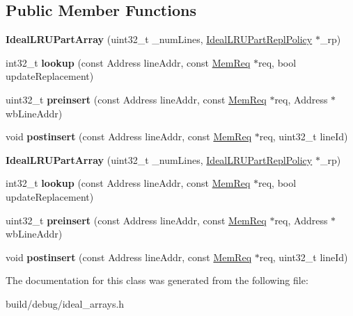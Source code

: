 \subsection*{Public Member Functions}
\begin{DoxyCompactItemize}
\item 
\hypertarget{classIdealLRUPartArray_a568cfad2ecdcbb3252d9aea18ebe89d5}{{\bfseries Ideal\-L\-R\-U\-Part\-Array} (uint32\-\_\-t \-\_\-num\-Lines, \hyperlink{classIdealLRUPartReplPolicy}{Ideal\-L\-R\-U\-Part\-Repl\-Policy} $\ast$\-\_\-rp)}\label{classIdealLRUPartArray_a568cfad2ecdcbb3252d9aea18ebe89d5}

\item 
\hypertarget{classIdealLRUPartArray_aa73a82fc679c92237e03bb21ec260ee9}{int32\-\_\-t {\bfseries lookup} (const Address line\-Addr, const \hyperlink{structMemReq}{Mem\-Req} $\ast$req, bool update\-Replacement)}\label{classIdealLRUPartArray_aa73a82fc679c92237e03bb21ec260ee9}

\item 
\hypertarget{classIdealLRUPartArray_a2b01290a2a0f8748057e1fa2a52cbea9}{uint32\-\_\-t {\bfseries preinsert} (const Address line\-Addr, const \hyperlink{structMemReq}{Mem\-Req} $\ast$req, Address $\ast$wb\-Line\-Addr)}\label{classIdealLRUPartArray_a2b01290a2a0f8748057e1fa2a52cbea9}

\item 
\hypertarget{classIdealLRUPartArray_ae3bd83a71bc6234f2c954b54b73c5171}{void {\bfseries postinsert} (const Address line\-Addr, const \hyperlink{structMemReq}{Mem\-Req} $\ast$req, uint32\-\_\-t line\-Id)}\label{classIdealLRUPartArray_ae3bd83a71bc6234f2c954b54b73c5171}

\item 
\hypertarget{classIdealLRUPartArray_a568cfad2ecdcbb3252d9aea18ebe89d5}{{\bfseries Ideal\-L\-R\-U\-Part\-Array} (uint32\-\_\-t \-\_\-num\-Lines, \hyperlink{classIdealLRUPartReplPolicy}{Ideal\-L\-R\-U\-Part\-Repl\-Policy} $\ast$\-\_\-rp)}\label{classIdealLRUPartArray_a568cfad2ecdcbb3252d9aea18ebe89d5}

\item 
\hypertarget{classIdealLRUPartArray_aa73a82fc679c92237e03bb21ec260ee9}{int32\-\_\-t {\bfseries lookup} (const Address line\-Addr, const \hyperlink{structMemReq}{Mem\-Req} $\ast$req, bool update\-Replacement)}\label{classIdealLRUPartArray_aa73a82fc679c92237e03bb21ec260ee9}

\item 
\hypertarget{classIdealLRUPartArray_a2b01290a2a0f8748057e1fa2a52cbea9}{uint32\-\_\-t {\bfseries preinsert} (const Address line\-Addr, const \hyperlink{structMemReq}{Mem\-Req} $\ast$req, Address $\ast$wb\-Line\-Addr)}\label{classIdealLRUPartArray_a2b01290a2a0f8748057e1fa2a52cbea9}

\item 
\hypertarget{classIdealLRUPartArray_ae3bd83a71bc6234f2c954b54b73c5171}{void {\bfseries postinsert} (const Address line\-Addr, const \hyperlink{structMemReq}{Mem\-Req} $\ast$req, uint32\-\_\-t line\-Id)}\label{classIdealLRUPartArray_ae3bd83a71bc6234f2c954b54b73c5171}

\end{DoxyCompactItemize}


The documentation for this class was generated from the following file\-:\begin{DoxyCompactItemize}
\item 
build/debug/ideal\-\_\-arrays.\-h\end{DoxyCompactItemize}
